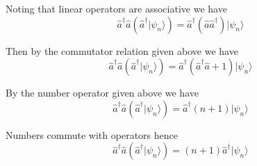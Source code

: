 


\bigskip
Noting that linear operators are associative we have
\begin{equation*}
\hat a^\dag\hat a\left(\hat a^\dag|\psi_n\rangle\right)
=\hat a^\dag(\hat a\hat a^\dag)|\psi_n\rangle
\end{equation*}

Then by the commutator relation given above we have
\begin{equation*}
\hat a^\dag\hat a\left(\hat a^\dag|\psi_n\rangle\right)
=\hat a^\dag(\hat a^\dag\hat a+1)|\psi_n\rangle
\end{equation*}

By the number operator given above we have
\begin{equation*}
\hat a^\dag\hat a\left(\hat a^\dag|\psi_n\rangle\right)
=\hat a^\dag(n+1)|\psi_n\rangle
\end{equation*}

Numbers commute with operators hence
\begin{equation*}
\hat a^\dag\hat a\left(\hat a^\dag|\psi_n\rangle\right)
=(n+1)\hat a^\dag|\psi_n\rangle
\end{equation*}


